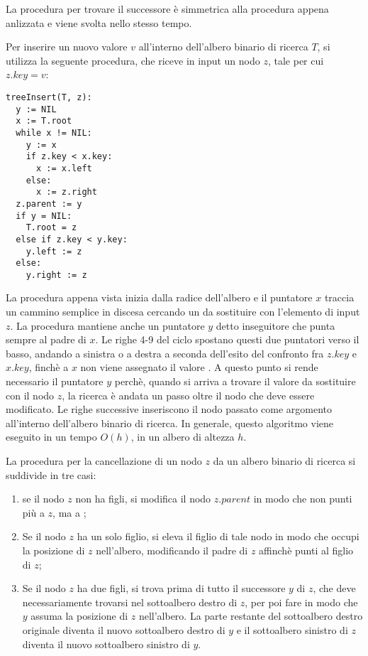 La procedura per trovare il successore è simmetrica alla procedura appena anlizzata e viene svolta nello stesso tempo. 

\vspace{10pt}

Per inserire un nuovo valore \(v\) all'interno dell'albero binario di ricerca \(T\), si utilizza la seguente procedura, che riceve in input un nodo \(z\), tale per cui \(z.key = v\):

\begin{lstlisting}
treeInsert(T, z):
  y := NIL
  x := T.root
  while x != NIL:
    y := x
    if z.key < x.key:
      x := x.left
    else:
      x := z.right
  z.parent := y
  if y = NIL:
    T.root = z
  else if z.key < y.key:
    y.left := z
  else:
    y.right := z
\end{lstlisting}

La procedura appena vista inizia dalla radice dell'albero e il puntatore \(x\) traccia un cammino semplice in discesa cercando un  da sostituire con l'elemento di input \(z\). La procedura mantiene anche un puntatore \(y\) detto inseguitore che punta sempre al padre di \(x\). Le righe 4-9 del ciclo  spostano questi due puntatori verso il basso, andando a sinistra o a destra a seconda dell'esito del confronto fra \({z.key}\) e \(x.key\), finchè a \(x\) non viene assegnato il valore . A questo punto si rende necessario il puntatore \(y\) perchè, quando si arriva a trovare il valore  da sostituire con il nodo \(z\), la ricerca è andata un passo oltre il nodo che deve essere modificato. Le righe successive inseriscono il nodo passato come argomento all'interno dell'albero binario di ricerca. In generale, questo algoritmo viene eseguito in un tempo \(O(h)\), in un albero di altezza \(h\).

\vspace{10pt}

La procedura per la cancellazione di un nodo \(z\) da un albero binario di ricerca si suddivide in tre casi:
\begin{enumerate}
  \item se il nodo \(z\) non ha figli, si modifica il nodo \(z.parent\) in modo che non punti più a \(z\), ma a ;
  \item Se il nodo \(z\) ha un solo figlio, si eleva il figlio di tale nodo in modo che occupi la posizione di \(z\) nell'albero, modificando il padre di \(z\) affinchè punti al figlio di \(z\);
  \item Se il nodo \(z\) ha due figli, si trova prima di tutto il successore \(y\) di \(z\), che deve necessariamente trovarsi nel sottoalbero destro di \(z\), per poi fare in modo che \(y\) assuma la posizione di \(z\) nell'albero. La parte restante del sottoalbero destro originale diventa il nuovo sottoalbero destro di \(y\) e il sottoalbero sinistro di \(z\) diventa il nuovo sottoalbero sinistro di \(y\).
\end{enumerate}

